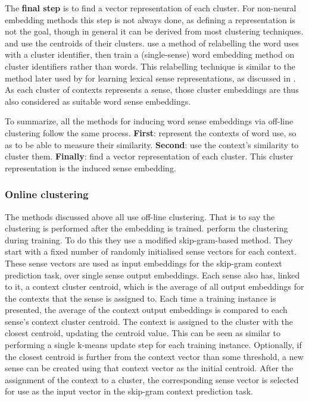 \documentclass[12pt,parskip]{komatufte}
\begin{document}
The \textbf{final step} is to find a vector representation of each cluster.
For non-neural embedding methods this step is not always done, as defining a representation is not the goal, though in general it can be derived from most clustering techniques.
\textcite{Schutze:1998wordsenseclustering} and 
\textcite{kaageback2015neural} use the centroids of their clusters.
\textcite{Huang2012} use a method of relabelling the word uses with a cluster identifier,
then train a (single-sense) word embedding method on cluster identifiers rather than words.
This relabelling technique is similar to the method later used by \textcite{Chen2014} for learning lexical sense representations, as discussed in .
As each cluster of contexts represents a sense, those cluster embeddings are thus also considered as  suitable word sense embeddings.

To summarize, all the methods for inducing word sense embeddings via off-line clustering follow the same process.
\textbf{First}: represent the contexts of word use, so as to be able to measure their similarity.
\textbf{Second}: use the context's similarity to cluster them.
\textbf{Finally}: find a vector representation of each cluster.
This cluster representation is the induced sense embedding.

\subsubsection{Online clustering}
The methods discussed above all use off-line clustering.
That is to say the clustering is performed after the embedding is trained.
 perform the clustering during training.
To do this they use a modified skip-gram-based method.
They start with a fixed number of randomly initialised sense vectors for each context.
These sense vectors are used as input embeddings for the skip-gram context prediction task, over single sense output embeddings.
Each sense also has, linked to it, a context cluster centroid, which is the average of all output embeddings for the contexts that the sense is assigned to.
Each time a training instance is presented, the average of the context output embeddings is compared to each sense's context cluster centroid.
The context is assigned to the cluster with the closest centroid, updating the centroid value.
This can be seen as similar to performing a single k-means update step for each training instance.
Optionally, if the closest centroid is further from the context vector than some threshold,  a new sense can be created using that context vector as the initial centroid.
After the assignment of the context to a cluster, the corresponding sense vector is selected for use as the input vector in the skip-gram context prediction task.
\end{document}
